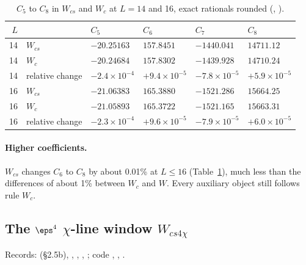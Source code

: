 \begin{table}[ht]
\centering\footnotesize\renewcommand{\arraystretch}{1.15}
\begin{tabular}{@{}rlllll@{}}
\toprule
$L$ & & $C_5$ & $C_6$ & $C_7$ & $C_8$ \\\midrule
14 & $W_{cs}$ & $-20.25163$ & $157.8451$ & $-1440.041$ & $14711.12$ \\
14 & $W_c$ & $-20.24684$ & $157.8302$ & $-1439.928$ & $14710.24$ \\
14 & relative change & $-2.4\times10^{-4}$ & $+9.4\times10^{-5}$ & $-7.8\times10^{-5}$ & $+5.9\times10^{-5}$ \\\midrule
16 & $W_{cs}$ & $-21.06383$ & $165.3880$ & $-1521.286$ & $15664.25$ \\
16 & $W_c$ & $-21.05893$ & $165.3722$ & $-1521.165$ & $15663.31$ \\
16 & relative change & $-2.3\times10^{-4}$ & $+9.6\times10^{-5}$ & $-7.9\times10^{-5}$ & $+6.0\times10^{-5}$ \\
\bottomrule
\end{tabular}
\caption{$C_5$ to $C_8$ in $W_{cs}$ and $W_c$ at $L=14$ and 16, exact rationals rounded (,
).}
\label{d2:tab:wcsCn}
\end{table}

\paragraph{Higher coefficients.} $W_{cs}$ changes $C_6$ to $C_8$ by about 0.01\% at $L\le16$ (Table~\ref{d2:tab:wcsCn}), much
less than the differences of about 1\% between $W_c$ and $W$. Every auxiliary object still follows rule $W_c$.

\subsection{The \texorpdfstring{$\eps^4$}{eps4} \texorpdfstring{$\chi$}{chi}-line window \texorpdfstring{$W_{cs4\chi}$}{Wcs4chi}}\label{d2:app:wcs4chi}
{\small\raggedright\noindent Records:  (\S2.5b),
, , ,
; code
, ,
.\par}

